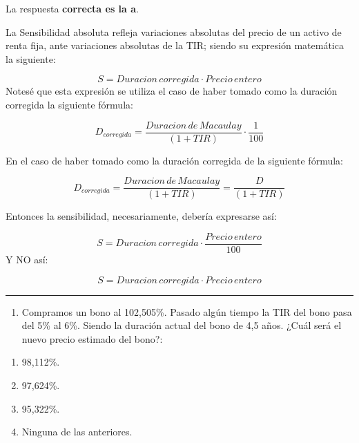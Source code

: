 \documentclass[
  letterpaper,
  DIV=11,
  numbers=noendperiod]{scrreprt}
\providecommand{\tightlist}{%
  \setlength{\itemsep}{0pt}\setlength{\parskip}{0pt}}\usepackage{longtable,booktabs,array}
\begin{document}
\begin{tcolorbox}
\begin{tcolorbox}[enhanced jigsaw, toprule=.15mm, left=2mm, arc=.35mm, breakable, bottomrule=.15mm, opacityback=0, rightrule=.15mm, leftrule=.75mm, colframe=quarto-callout-note-color-frame, colback=white]
\begin{minipage}[t]{\textwidth - 5.5mm}
La respuesta \textbf{correcta es la a}.

La Sensibilidad absoluta refleja variaciones absolutas del precio de un
activo de renta fija, ante variaciones absolutas de la TIR; siendo su
expresión matemática la siguiente:

\[S={Duracion\,corregida }\cdot{Precio\,entero}\] Notesé que esta
expresión se utiliza el caso de haber tomado como la duración corregida
la siguiente fórmula:

\[D_{corregida}=\frac{Duracion\,de\, Macaulay}{\left(1+TIR\right)}\cdot\frac{1}{100}\]

En el caso de haber tomado como la duración corregida de la siguiente
fórmula:

\[D_{corregida}=\frac{Duracion\,de\, Macaulay}{\left(1+TIR\right)}=\frac{D}{\left(1+TIR\right)} \]

Entonces la sensibilidad, necesariamente, debería expresarse así:

\[S= Duracion\,corregida \cdot \frac{Precio\,entero}{100}\] Y NO así:

\[S={Duracion\,corregida }\cdot{Precio\,entero}\]

\end{minipage}%
\end{tcolorbox}

\begin{center}\rule{0.5\linewidth}{0.5pt}\end{center}

\begin{enumerate}
\def\labelenumi{\arabic{enumi}.}
\setcounter{enumi}{19}
\tightlist
\item
  Compramos un bono al 102,505\%. Pasado algún tiempo la TIR del bono
  pasa del 5\% al 6\%. Siendo la duración actual del bono de 4,5 años.
  ¿Cuál será el nuevo precio estimado del bono?:
\end{enumerate}

\begin{enumerate}
\def\labelenumi{\alph{enumi}.}
\item
  98,112\%.
\item
  97,624\%.
\item
  95,322\%.
\item
  Ninguna de las anteriores.
\end{enumerate}

\begin{tcolorbox}[enhanced jigsaw, toprule=.15mm, left=2mm, arc=.35mm, breakable, bottomrule=.15mm, opacityback=0, rightrule=.15mm, leftrule=.75mm, colframe=quarto-callout-note-color-frame, colback=white]
\begin{minipage}[t]{5.5mm}
\textcolor{quarto-callout-note-color}{\faInfo}
\end{minipage}%
\begin{minipage}[t]{\textwidth - 5.5mm}


\end{minipage}
\end{tcolorbox}
\end{tcolorbox}
\end{document}
